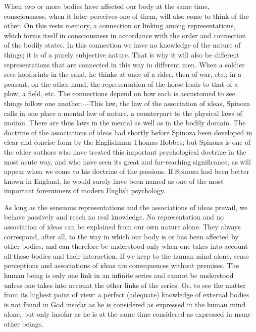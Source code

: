 \documentclass[12pt]{book}
\newcommand{\opage}[1]{\marginnote{\footnotesize\textit{[#1]}}}
\begin{document}
When two or more bodies have affected our body at the same time, consciousness, when it
later perceives one of them, will also come to think of the other. On this rests memory,
a connection or linking among representations, which forms itself in consciousness in
accordance with the order and connection of the bodily states. In this connection we
have no knowledge of the nature of things; it is of a purely subjective nature. That is
why it will also be different representations that are connected in this way in
different men. When a soldier sees hoofprints in the sand, he thinks at once of a rider,
then of war, etc.; in a peasant, on the other hand, the representation of the horse
leads to that of a plow, a field, etc. The connections depend on how each is accustomed
to see things follow one another.---This law, the law of the association of ideas,
Spinoza calls in one place a mental law of nature, a counterpart to the physical laws of
motion. There are thus laws in the mental as well as in the bodily domain. The doctrine
of the associations of ideas had shortly before Spinoza been developed in clear and
concise form by the Englishman \opage{105}Thomas Hobbes; but Spinoza is one of the older
authors who have treated this important psychological doctrine in the most acute way,
and who have seen its great and far-reaching significance, as will appear when we come
to his doctrine of the passions. If Spinoza had been better known in England, he would
surely have been named as one of the most important forerunners of modern English
psychology.

As long as the sensuous representations and the associations of ideas %
prevail, we behave passively and reach no real knowledge. No representation and no
association of ideas can be explained from our own nature alone. They always correspond,
after all, to the way in which our body is or has been affected by other bodies, and can
therefore be understood only when one takes into account all these bodies and their
interaction. If we keep to the human mind alone, sense perceptions and associations of
ideas are consequences without premises. The human being is only one link in an
infinite series and cannot be understood unless one takes into account the other links
of the series. Or, to see the matter from its highest point of view: a perfect
(adequate) knowledge of external bodies is not found in God insofar as he is considered
as expressed in the human mind alone, but only insofar as he is at the same time
considered as expressed in many other beings.
\end{document}
